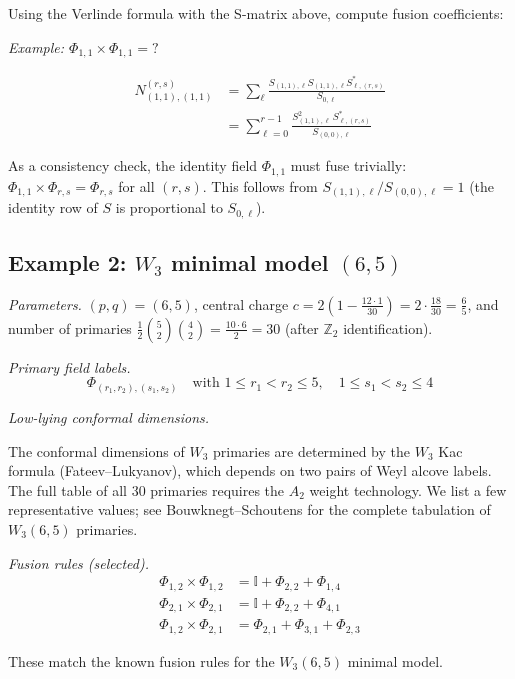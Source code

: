 \begin{computation}\label{comp:fusion-3-4}

Using the Verlinde formula with the S-matrix above, compute fusion coefficients:

\emph{Example: $\Phi_{1,1} \times \Phi_{1,1} = ?$}

\begin{align}
N_{(1,1),(1,1)}^{(r,s)} &= \sum_{\ell} \frac{S_{(1,1),\ell} S_{(1,1),\ell} S_{\ell,(r,s)}^*}
{S_{0,\ell}} \\
&= \sum_{\ell=0}^{r-1} \frac{S_{(1,1),\ell}^2\, S_{\ell,(r,s)}^*}{S_{(0,0),\ell}}
\end{align}

As a consistency check, the identity field $\Phi_{1,1}$ must fuse trivially: $\Phi_{1,1} \times \Phi_{r,s} = \Phi_{r,s}$ for all $(r,s)$. This follows from $S_{(1,1),\ell}/S_{(0,0),\ell} = 1$ (the identity row of $S$ is proportional to $S_{0,\ell}$).

\end{computation}

\subsection{\texorpdfstring{Example 2: $W_3$ minimal model $(6,5)$}{Example 2: W 3 minimal model (6,5)}}
\label{subsec:w3-example-6-5}

\begin{example}[\texorpdfstring{$W_3(6,5)$}{W_3(6,5)}]\label{ex:w3-6-5}

\emph{Parameters.}
$(p,q) = (6,5)$, central charge $c = 2(1 - \frac{12 \cdot 1}{30}) = 2 \cdot \frac{18}{30}
= \frac{6}{5}$, and number of primaries $\frac{1}{2}\binom{5}{2}\binom{4}{2} = \frac{10 \cdot 6}{2} = 30$ (after $\mathbb{Z}_2$ identification).

\emph{Primary field labels.}
\[\Phi_{(r_1,r_2),(s_1,s_2)} \quad \text{with } 1 \leq r_1 < r_2 \leq 5, \quad 1 \leq s_1 < s_2 \leq 4\]

\emph{Low-lying conformal dimensions.}

The conformal dimensions of $W_3$ primaries are determined by the $W_3$ Kac formula (Fateev--Lukyanov), which depends on two pairs of Weyl alcove labels.  The full table of all 30 primaries requires the $A_2$ weight technology.  We list a few representative values; see Bouwknegt--Schoutens for the complete tabulation of $W_3(6,5)$ primaries.

\emph{Fusion rules (selected).}
\begin{align}
\Phi_{1,2} \times \Phi_{1,2} &= \mathbb{I} + \Phi_{2,2} + \Phi_{1,4} \\
\Phi_{2,1} \times \Phi_{2,1} &= \mathbb{I} + \Phi_{2,2} + \Phi_{4,1} \\
\Phi_{1,2} \times \Phi_{2,1} &= \Phi_{2,1} + \Phi_{3,1} + \Phi_{2,3}
\end{align}

These match the known fusion rules for the $W_3(6,5)$ minimal model.
\end{example}

